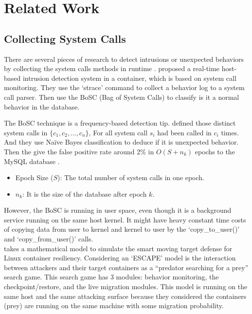 \chapter{Related Work}

\section{Collecting System Calls}
There are several pieces of research to detect intrusions or unexpected behaviors
by collecting the system calls methods in runtime \cite{10.1007/978-3-319-24858-5_8,9307722,7809699,7796855}.
\textcite{10.1007/978-3-319-24858-5_8} proposed a real-time host-based intrusion
detection system in a container, which is based on system call monitoring. They use
the `strace' command to collect a behavior log to a system call parser. Then use the
BoSC (Bag of System Calls) \cite{1495942} to classify is it a normal behavior in
the database.

The BoSC technique is a frequency-based detection tip. \textcite{1495942} defined
those distinct system calls in $\{c_1, c_2, \dots, c_n \}$, For all system call $s_i$
had been called in $c_i$ times. And they use Na\"ive Bayes classification to deduce if
it is unexpected behavior. Then the \citeauthor{10.1007/978-3-319-24858-5_8} give the false positive rate
around 2\% in $O(S+n_k)$ epochs to the MySQL database \cite{10.1007/978-3-319-24858-5_8}.
\begin{itemize}
    \item Epoch Size ($S$): The total number of system calls in one epoch.
    \item $n_k$: It is the size of the database after epoch $k$.
\end{itemize}
However, the BoSC is running in user space, even though it is a background service running
on the same host kernel. It might have heavy constant time costs of copying data from
user to kernel and kernel to user by the `copy\_to\_user()' and `copy\_from\_user()' calls.\\

\textcite{7809699,7796855} takes a mathematical model to simulate the
smart moving target defense for Linux container resiliency. Considering an `ESCAPE' model
is the interaction between attackers and their target containers as a “predator searching
for a prey” search game. This search game has 3 modules: behavior monitoring, the
checkpoint/restore, and the live migration modules.
This model is running on the same host and the same attacking surface because they considered
the containers (prey) are running on the same machine with some migration probability.

